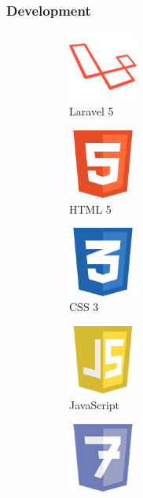 \subsubsection{Development}
\begin{figure}[H]
	\centering
	\begin{subfigure}[t]{0.9in}
		\centering
		\includegraphics[width=0.9in]{images/icons/Laravel}
		\caption{Laravel 5}\label{fig:Laravel}		
	\end{subfigure}
	\quad
	\begin{subfigure}[t]{0.9in}
		\centering
		\includegraphics[width=0.9in]{images/icons/HTML_5}
		\caption{HTML 5}\label{fig:HTML_5}
	\end{subfigure}
    \quad
	\begin{subfigure}[t]{0.9in}
		\centering
		\includegraphics[width=0.9in]{images/icons/CSS_3}
		\caption{CSS 3}\label{fig:CSS_3}
	\end{subfigure}
    \quad
	\begin{subfigure}[t]{0.9in}
		\centering
		\includegraphics[width=0.9in]{images/icons/JavaScript}
		\caption{JavaScript}\label{fig:JavaScript}
	\end{subfigure}
    \quad
	\begin{subfigure}[t]{0.9in}
		\centering
		\includegraphics[width=0.9in]{images/icons/PHP_7}

\end{subfigure}
\end{figure}
